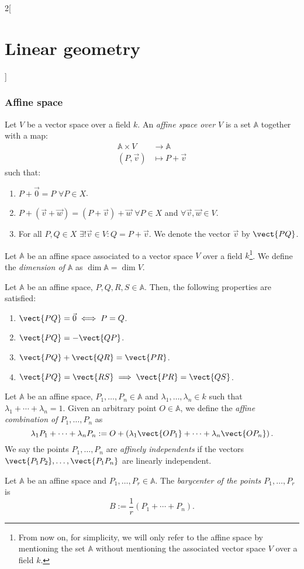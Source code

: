 \documentclass[../../../main.tex]{subfiles}
\begin{document}
\begin{multicols}{2}[\section{Linear geometry}]
\subsubsection*{Affine space}
\begin{definition}
Let $V$ be a vector space over a field $k$. An \textit{affine space over $V$} is a set $\mathbb{A}$ together with a map:
\begin{align*}
    \mathbb{A}\times V&\rightarrow \mathbb{A}\\
    (P,\vec{v})&\mapsto P+\vec{v}
\end{align*}
such that:
\begin{enumerate}
    \item $P+\vec{0}=P$ $\forall P\in X$.
    \item $P+(\vec{v}+\vec{w})=(P+\vec{v})+\vec{w}$ $\forall P\in X$ and $\forall\vec{v},\vec{w}\in V$.
    \item For all $P,Q\in X$ $\exists!\vec{v}\in V:Q=P+\vec{v}$. We denote the vector $\vec{v}$ by $\vect{PQ}$.
\end{enumerate}
\end{definition}
\begin{definition}
Let $\mathbb{A}$ be an affine space associated to a vector space $V$ over a field $k$\footnote{From now on, for simplicity, we will only refer to the affine space by mentioning the set $\mathbb{A}$ without mentioning the associated vector space $V$ over a field $k$.}. We define the \textit{dimension of $\mathbb{A}$} as $\dim\mathbb{A}=\dim V$.
\end{definition}
\begin{prop}
Let $\mathbb{A}$ be an affine space, $P,Q,R,S\in\mathbb{A}$. Then, the following properties are satisfied:
\begin{enumerate}
    \item $\vect{PQ}=\vec{0}\iff P=Q$.
    \item $\vect{PQ}=-\vect{QP}$.
    \item $\vect{PQ}+\vect{QR}=\vect{PR}$.
    \item $\vect{PQ}=\vect{RS}\implies\vect{PR}=\vect{QS}$.
\end{enumerate}
\end{prop}
\begin{definition}
Let $\mathbb{A}$ be an affine space, $P_1,\ldots,P_n\in\mathbb{A}$ and $\lambda_1,\ldots,\lambda_n\in k$ such that $\lambda_1+\cdots+\lambda_n=1$. Given an arbitrary point $O\in\mathbb{A}$, we define the \textit{affine combination of $P_1,\ldots,P_n$} as $$\lambda_1P_1+\cdots+\lambda_nP_n:=O+\left(\lambda_1\vect{OP_1}+\cdots+\lambda_n\vect{OP_n}\right).$$ We say the points $P_1,\ldots,P_n$ are \textit{affinely independents} if the vectors $\vect{P_1P_2},\ldots,\vect{P_1P_n}$ are linearly independent.
\end{definition}
\begin{definition}
Let $\mathbb{A}$ be an affine space and $P_1,\ldots,P_r\in\mathbb{A}$. The \textit{barycenter of the points $P_1,\ldots,P_r$} is $$B:=\frac{1}{r}\left(P_1+\cdots+P_n\right).$$
\end{definition}

\end{multicols}
\end{document}
